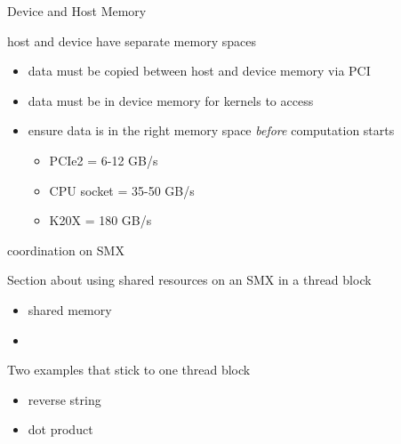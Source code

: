 \begin{frame}[fragile]{Device and Host Memory}
    \begin{info}{host and device have separate memory spaces}
        \begin{itemize}
            \item data must be copied between host and device memory via PCI
            \item data must be in device memory for kernels to access
            \item ensure data is in the right memory space \emph{before} computation starts
                \begin{itemize}
                    \item PCIe2 = 6-12 GB/s
                    \item CPU socket = 35-50 GB/s
                    \item K20X  = 180 GB/s
                \end{itemize}
        \end{itemize}
    \end{info}

\end{frame}


\begin{frame}[fragile]{coordination on SMX}
    \begin{info}{}
        Section about using shared resources on an SMX in a thread block
        \begin{itemize}
            \item shared memory
            \item {}
        \end{itemize}
        Two examples that stick to one thread block
        \begin{itemize}
            \item reverse string
            \item dot product
        \end{itemize}
    \end{info}

\end{frame}

